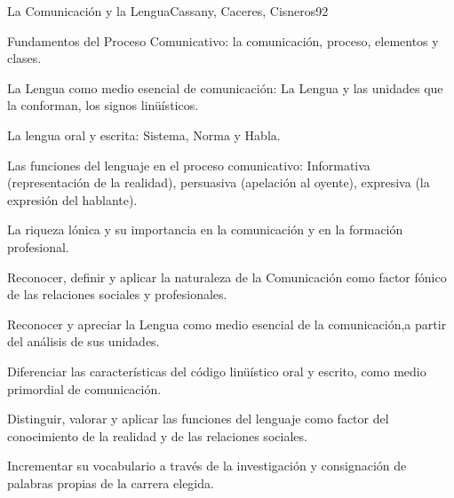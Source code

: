 \begin{syllabus}
\begin{unit}{La Comunicación y la Lengua}{Cassany, Caceres, Cisneros}{9}{2}
\begin{topics}
      \item Fundamentos del Proceso Comunicativo: la comunicación, proceso, elementos y clases. 
      \item La Lengua como medio esencial de comunicación: La Lengua y las unidades que  la conforman, los signos linüísticos.
      \item La lengua oral y escrita: Sistema, Norma y Habla. 
      \item Las funciones del lenguaje en el proceso comunicativo: Informativa (representación de la realidad), persuasiva (apelación al oyente), expresiva (la expresión del hablante).
      \item La riqueza lónica y su importancia en la comunicación y en la formación profesional.
\end{topics}
\begin{learningoutcomes}
   \item Reconocer, definir y aplicar la naturaleza de la Comunicación como factor fónico de las relaciones sociales y profesionales.
   \item Reconocer y apreciar la Lengua como medio esencial de la comunicación,a partir del análisis de sus unidades.
   \item Diferenciar las características del código linüístico oral y escrito,
   como medio primordial de comunicación.
   \item Distinguir, valorar y aplicar las funciones del lenguaje como factor del conocimiento de la realidad y de las relaciones sociales.
   \item Incrementar su vocabulario a través de la investigación y consignación de palabras propias de la carrera elegida.
\end{learningoutcomes}

\end{unit}


\end{syllabus}

